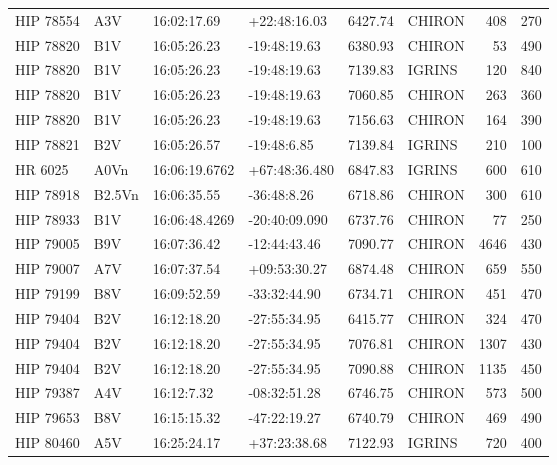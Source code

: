 \documentclass{emulateapj}
\begin{document}
\begin{longtable*}{|l|lllrlrr|}
   HIP 78554 &            A3V &    16:02:17.69 &   +22:48:16.03 &  6427.74 &     CHIRON &      408 &     270 \\
   HIP 78820 &            B1V &    16:05:26.23 &   -19:48:19.63 &  6380.93 &     CHIRON &       53 &     490 \\
   HIP 78820 &            B1V &    16:05:26.23 &   -19:48:19.63 &  7139.83 &     IGRINS &      120 &     840 \\
   HIP 78820 &            B1V &    16:05:26.23 &   -19:48:19.63 &  7060.85 &     CHIRON &      263 &     360 \\
   HIP 78820 &            B1V &    16:05:26.23 &   -19:48:19.63 &  7156.63 &     CHIRON &      164 &     390 \\
   HIP 78821 &            B2V &    16:05:26.57 &    -19:48:6.85 &  7139.84 &     IGRINS &      210 &     100 \\
     HR 6025 &           A0Vn &  16:06:19.6762 &  +67:48:36.480 &  6847.83 &     IGRINS &      600 &     610 \\
   HIP 78918 &         B2.5Vn &    16:06:35.55 &    -36:48:8.26 &  6718.86 &     CHIRON &      300 &     610 \\
   HIP 78933 &            B1V &  16:06:48.4269 &  -20:40:09.090 &  6737.76 &     CHIRON &       77 &     250 \\
   HIP 79005 &            B9V &    16:07:36.42 &   -12:44:43.46 &  7090.77 &     CHIRON &     4646 &     430 \\
   HIP 79007 &            A7V &    16:07:37.54 &   +09:53:30.27 &  6874.48 &     CHIRON &      659 &     550 \\
   HIP 79199 &            B8V &    16:09:52.59 &   -33:32:44.90 &  6734.71 &     CHIRON &      451 &     470 \\
   HIP 79404 &            B2V &    16:12:18.20 &   -27:55:34.95 &  6415.77 &     CHIRON &      324 &     470 \\
   HIP 79404 &            B2V &    16:12:18.20 &   -27:55:34.95 &  7076.81 &     CHIRON &     1307 &     430 \\
   HIP 79404 &            B2V &    16:12:18.20 &   -27:55:34.95 &  7090.88 &     CHIRON &     1135 &     450 \\
   HIP 79387 &            A4V &     16:12:7.32 &   -08:32:51.28 &  6746.75 &     CHIRON &      573 &     500 \\
   HIP 79653 &            B8V &    16:15:15.32 &   -47:22:19.27 &  6740.79 &     CHIRON &      469 &     490 \\
   HIP 80460 &            A5V &    16:25:24.17 &   +37:23:38.68 &  7122.93 &     IGRINS &      720 &     400 \\

\end{longtable*}
\end{document}
